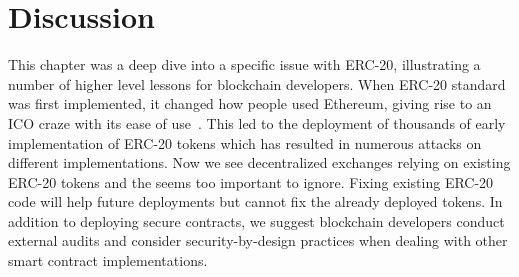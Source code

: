 \section{Discussion}
This chapter was a deep dive into a specific issue with ERC-20, illustrating a number of higher level lessons for blockchain developers. When ERC-20 standard was first implemented, it changed how people used Ethereum, giving rise to an ICO craze with its ease of use~\cite{fenu2018ico}. This led to the deployment of thousands of early implementation of ERC-20 tokens which has resulted in numerous attacks on different implementations. Now we see decentralized exchanges relying on existing ERC-20 tokens and the \mwa seems too important to ignore. Fixing existing ERC-20 code will help future deployments but cannot fix the already deployed tokens. In addition to deploying secure contracts, we suggest blockchain developers conduct external audits and consider security-by-design practices when dealing with other smart contract implementations.